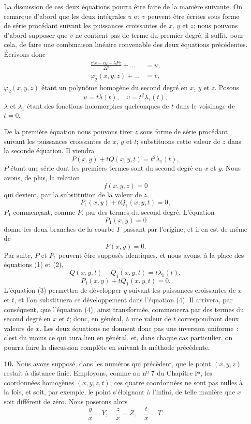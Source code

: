 \documentclass{article}
\begin{document}
La discussion de ces deux équations pourra être faite de la manière suivante. On remarque d'abord que les deux intégrales $u$ et $v$ peuvent être écrites sous forme de série procédant suivant les puissances croissantes de $x$, $y$ et $z$; nous pouvons d'abord supposer que $v$ ne contient pas de terme du premier degré, il suffit, pour cela, de faire une combinaison linéaire convenable des deux équations précédentes. Écrivons donc
\[
\begin{aligned}
\frac{c'x - cy - \lambda Pz}{2P} + \ldots &= u, \\
\varphi_{2}(x, y, z) + \ldots &= v,
\end{aligned}
\]
$\varphi_{2}(x, y, z)$ étant un polynôme homogène du second degré en $x$, $y$ et $z$. Posons
\[
u = t\lambda(t), \quad v = t^{2}\lambda_{1}(t),
\]
$\lambda$ et $\lambda_{1}$ étant des fonctions holomorphes quelconques de $t$ dans le voisinage de $t = 0$.

De la première équation nous pouvons tirer $z$ sous forme de série procédant suivant les puissances croissantes de $x$, $y$ et $t$; substituons cette valeur de $z$ dans la seconde équation. Il viendra
\[
P(x, y) + tQ(x, y, t) = t^{2}\lambda_{1}(t), \tag{1}
\]
$P$ étant une série dont les premiers termes sont du second degré en $x$ et $y$. Nous avons, de plus, la relation
\[
f(x, y, z) = 0
\]
qui devient, par la substitution de la valeur de $z$,
\[
P_{1}(x, y) + tQ_{1}(x, y, t) = 0, \tag{2}
\]
$P_{1}$ commençant, comme $P$, par des termes du second degré. L'équation
\[
P_{1}(x, y) = 0
\]
donne les deux branches de la courbe $\Gamma$ passant par l'origine, et il en est de même de
\[
P(x, y) = 0.
\]
Par suite, $P$ et $P_{1}$ peuvent être supposés identiques, et nous avons, à la place des équations (1) et (2),
\[
Q(x, y, t) - Q_{1}(x, y, t) = t\lambda_{1}(t), \tag{3}
\]
\[
P_{1}(x, y) + tQ_{1}(x, y, t) = 0. \tag{4}
\]
L'équation (3) permettra de développer $y$ suivant les puissances croissantes de $x$ et $t$, et l'on substituera ce développement dans l'équation (4). Il arrivera, par conséquent, que l'équation (4), ainsi transformée, commencera par des termes du second degré en $x$ et $t$; donc, en général, à une valeur de $t$ correspondront deux valeurs de $x$. Les deux équations ne donnent donc pas une inversion uniforme~: c'est du moins ce qui aura lieu en général, et, dans chaque cas particulier, on pourra faire la discussion complète en suivant la méthode précédente.

\textbf{10.} Nous avons supposé, dans les numéros qui précèdent, que le point $(x, y, z)$ restait à distance finie. Employons, comme au nº 7 du Chapitre Iᵉʳ, les coordonnées homogènes $(x, y, z, t)$; ces quatre coordonnées ne sont pas nulles à la fois, et soit, par exemple, le point s'éloignant à l'infini, de telle manière que $x$ soit différent de zéro. Nous poserons alors
\[
\frac{y}{x} = Y, \quad \frac{z}{x} = Z, \quad \frac{t}{x} = T.
\]
\end{document}
